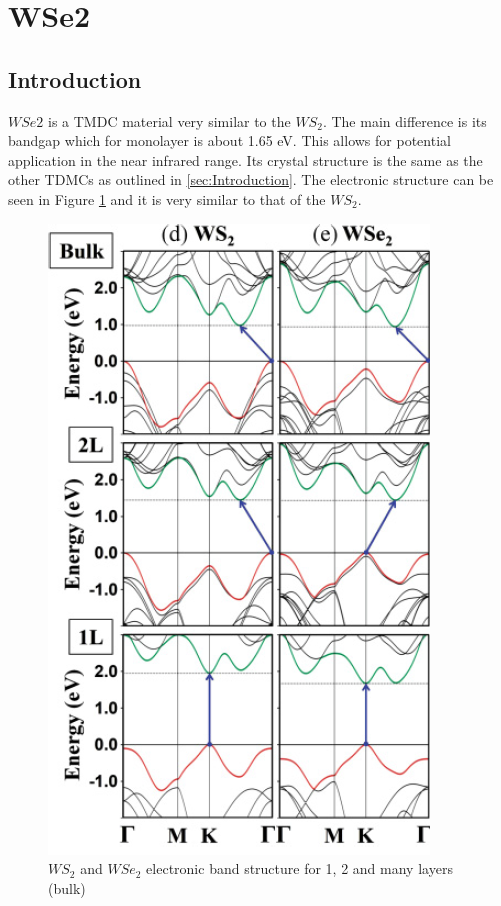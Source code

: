 \section{WSe2}

	\subsection{Introduction}
	
		$WSe2$ is a TMDC material very similar to the $WS_2$. The main difference is its bandgap which for monolayer is about 1.65 eV. This allows for potential application in the near infrared range. Its crystal structure is the same as the other TDMCs as outlined in \ref{sec:Introduction}. The electronic structure can be seen in Figure \ref{fig:WSe2BandStructureWSe2WS2} and it is very similar to that of the $WS_2$. 
		
\begin{figure}[!h]
	\begin{center}
		\includegraphics[scale=0.5]{WSe2/WSe2BandStructureWSe2WS2.png}
		\caption{$WS_2$ and $WSe_2$ electronic band structure for 1, 2 and many layers (bulk)}
		\label{fig:WSe2BandStructureWSe2WS2}
	\end{center}
\end{figure}
	
